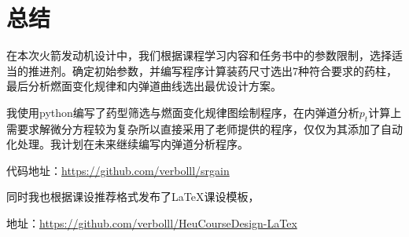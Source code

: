 
\chapter{总结}

在本次火箭发动机设计中，我们根据课程学习内容和任务书中的参数限制，选择适当的推进剂。确定初始参数，并编写程序计算装药尺寸选出7种符合要求的药柱，最后分析燃面变化规律和内弹道曲线选出最优设计方案。

我使用python编写了药型筛选与燃面变化规律图绘制程序，在内弹道分析$p_{t}$计算上需要求解微分方程较为复杂所以直接采用了老师提供的程序，仅仅为其添加了自动化处理。我计划在未来继续编写内弹道分析程序。

代码地址：\href{https://github.com/verbolll/srgain}{https://github.com/verbolll/srgain}

同时我也根据课设推荐格式发布了\LaTeX{}课设模板，

地址：\href{https://github.com/verbolll/HeuCourseDesign-LaTex}{https://github.com/verbolll/HeuCourseDesign-LaTex}